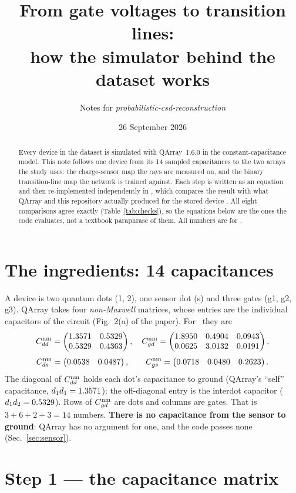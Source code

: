 \documentclass[10pt,a4paper]{article}
\title{From gate voltages to transition lines:\\
how the simulator behind the dataset works}
\author{Notes for \emph{probabilistic-csd-reconstruction}}
\date{26 September 2026}
\newcommand{\code}[1]{\texttt{\detokenize{#1}}}
\begin{document}
\maketitle

\begin{abstract}
\noindent
Every device in the dataset is simulated with QArray~1.6.0 in the
constant-capacitance model. This note follows one device from its 14
sampled capacitances to the two arrays the study uses: the charge-sensor
map the rays are measured on, and the binary transition-line map the
network is trained against. Each step is written as an equation and then
re-implemented independently in \code{make_note.py}, which compares the
result with what QArray and this repository actually produced for the
stored device \devname. All eight comparisons agree exactly
(Table~\ref{tab:checks}), so the equations below are the ones the code
evaluates, not a textbook paraphrase of them. All numbers are for
\devname.
\end{abstract}

\section{The ingredients: 14 capacitances}

A device is two quantum dots (1, 2), one sensor dot (s) and three gates
(g1, g2, g3). QArray takes four \emph{non-Maxwell} matrices, whose
entries are the individual capacitors of the circuit
(Fig.~2(a) of the paper). For \devname\ they are
\begin{equation}
C_{dd}^{\rm nm} = \begin{pmatrix}1.3571 & 0.5329 \\ 0.5329 & 0.4363\end{pmatrix},\quad
C_{gd}^{\rm nm} = \begin{pmatrix}1.8950 & 0.4904 & 0.0943 \\ 0.0625 & 3.0132 & 0.0191\end{pmatrix},
\label{eq:nm}
\end{equation}
\begin{equation*}
C_{ds}^{\rm nm} = \begin{pmatrix}0.0538 & 0.0487\end{pmatrix},\qquad
C_{gs}^{\rm nm} = \begin{pmatrix}0.0718 & 0.0480 & 0.2623\end{pmatrix} .
\end{equation*}
The diagonal of $C_{dd}^{\rm nm}$ holds each dot's capacitance to ground
(QArray's ``self'' capacitance, $d_1d_1=1.3571$); the off-diagonal
entry is the interdot capacitor ($d_1d_2=0.5329$). Rows of $C_{gd}^{\rm
nm}$ are dots and columns are gates. That is
$3 + 6 + 2 + 3 = 14$ numbers. \textbf{There is no capacitance from the
sensor to ground}: QArray has no argument for one, and the code passes
none (Sec.~\ref{sec:sensor}).

\section{Step 1 --- the capacitance matrix}
\end{document}
